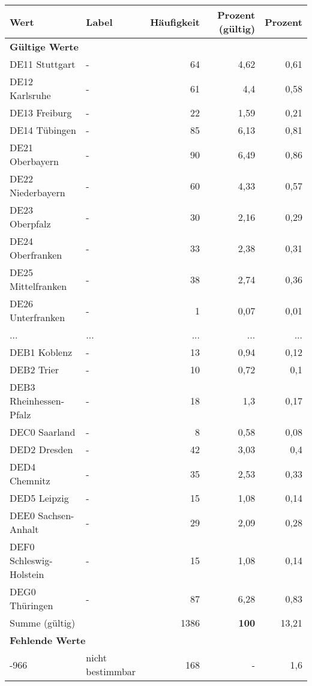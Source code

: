     \begin{longtable}{Xlrrr}
     \toprule
     \textbf{Wert} & \textbf{Label} & \textbf{Häufigkeit} & \textbf{Prozent (gültig)} & \textbf{Prozent} \\
     \endhead
     \midrule
     \multicolumn{5}{l}{\textbf{Gültige Werte}}\\
        \multicolumn{1}{X}{DE11 Stuttgart} & - & 64 & 4,62 & 0,61 \\
        \multicolumn{1}{X}{DE12 Karlsruhe} & - & 61 & 4,4 & 0,58 \\
        \multicolumn{1}{X}{DE13 Freiburg} & - & 22 & 1,59 & 0,21 \\
        \multicolumn{1}{X}{DE14 Tübingen} & - & 85 & 6,13 & 0,81 \\
        \multicolumn{1}{X}{DE21 Oberbayern} & - & 90 & 6,49 & 0,86 \\
        \multicolumn{1}{X}{DE22 Niederbayern} & - & 60 & 4,33 & 0,57 \\
        \multicolumn{1}{X}{DE23 Oberpfalz} & - & 30 & 2,16 & 0,29 \\
        \multicolumn{1}{X}{DE24 Oberfranken} & - & 33 & 2,38 & 0,31 \\
        \multicolumn{1}{X}{DE25 Mittelfranken} & - & 38 & 2,74 & 0,36 \\
        \multicolumn{1}{X}{DE26 Unterfranken} & - & 1 & 0,07 & 0,01 \\
       ... & ... & ... & ... & ... \\
        \multicolumn{1}{X}{DEB1 Koblenz} & - & 13 & 0,94 & 0,12 \\
        \multicolumn{1}{X}{DEB2 Trier} & - & 10 & 0,72 & 0,1 \\
        \multicolumn{1}{X}{DEB3 Rheinhessen-Pfalz} & - & 18 & 1,3 & 0,17 \\
        \multicolumn{1}{X}{DEC0 Saarland} & - & 8 & 0,58 & 0,08 \\
        \multicolumn{1}{X}{DED2 Dresden} & - & 42 & 3,03 & 0,4 \\
        \multicolumn{1}{X}{DED4 Chemnitz} & - & 35 & 2,53 & 0,33 \\
        \multicolumn{1}{X}{DED5 Leipzig} & - & 15 & 1,08 & 0,14 \\
        \multicolumn{1}{X}{DEE0 Sachsen-Anhalt} & - & 29 & 2,09 & 0,28 \\
        \multicolumn{1}{X}{DEF0 Schleswig-Holstein} & - & 15 & 1,08 & 0,14 \\
        \multicolumn{1}{X}{DEG0 Thüringen} & - & 87 & 6,28 & 0,83 \\
     \midrule
      \multicolumn{2}{l}{Summe (gültig)} & 1386 &
      \textbf{100} &
         13,21 \\
     \multicolumn{5}{l}{\textbf{Fehlende Werte}}\\
       -966 & nicht bestimmbar & 168 & - & 1,6 \\


\end{longtable}
